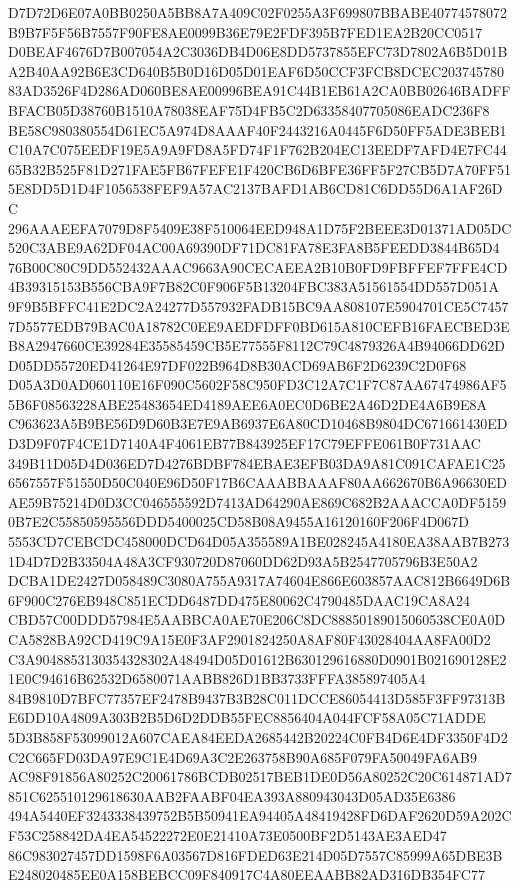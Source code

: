 \documentclass[UTF8,fontset=fandol,zihao=-4,a4paper]{ctexart}
\begin{document}
{{D7D72D6E07A0BB0250A5BB8A7A409C02F0255A3F699807BBABE40774578072B9B7F5F56B7557F90FE8AE0099B36E79E2FDF395B7FED1EA2B20CC0517
D0BEAF4676D7B007054A2C3036DB4D06E8DD5737855EFC73D7802A6B5D01BA2B40AA92B6E3CD640B5B0D16D05D01EAF6D50CCF3FCB8DCEC203745780
83AD3526F4D286AD060BE8AE00996BEA91C44B1EB61A2CA0BB02646BADFFBFACB05D38760B1510A78038EAF75D4FB5C2D63358407705086EADC236F8
BE58C980380554D61EC5A974D8AAAF40F2443216A0445F6D50FF5ADE3BEB1C10A7C075EEDF19E5A9A9FD8A5FD74F1F762B204EC13EEDF7AFD4E7FC44
65B32B525F81D271FAE5FB67FEFE1F420CB6D6BFE36FF5F27CB5D7A70FF515E8DD5D1D4F1056538FEF9A57AC2137BAFD1AB6CD81C6DD55D6A1AF26DC
296AAAEEFA7079D8F5409E38F510064EED948A1D75F2BEEE3D01371AD05DC520C3ABE9A62DF04AC00A69390DF71DC81FA78E3FA8B5FEEDD3844B65D4
76B00C80C9DD552432AAAC9663A90CECAEEA2B10B0FD9FBFFEF7FFE4CD4B39315153B556CBA9F7B82C0F906F5B13204FBC383A51561554DD557D051A
9F9B5BFFC41E2DC2A24277D557932FADB15BC9AA808107E5904701CE5C74577D5577EDB79BAC0A18782C0EE9AEDFDFF0BD615A810CEFB16FAECBED3E
B8A2947660CE39284E35585459CB5E77555F8112C79C4879326A4B94066DD62DD05DD55720ED41264E97DF022B964D8B30ACD69AB6F2D6239C2D0F68
D05A3D0AD060110E16F090C5602F58C950FD3C12A7C1F7C87AA67474986AF55B6F08563228ABE25483654ED4189AEE6A0EC0D6BE2A46D2DE4A6B9E8A
C963623A5B9BE56D9D60B3E7E9AB6937E6A80CD10468B9804DC671661430EDD3D9F07F4CE1D7140A4F4061EB77B843925EF17C79EFFE061B0F731AAC
349B11D05D4D036ED7D4276BDBF784EBAE3EFB03DA9A81C091CAFAE1C256567557F51550D50C040E96D50F17B6CAAABBAAAF80AA662670B6A96630ED
AE59B75214D0D3CC046555592D7413AD64290AE869C682B2AAACCA0DF51590B7E2C55850595556DDD5400025CD58B08A9455A16120160F206F4D067D
5553CD7CEBCDC458000DCD64D05A355589A1BE028245A4180EA38AAB7B2731D4D7D2B33504A48A3CF930720D87060DD62D93A5B2547705796B3E50A2
DCBA1DE2427D058489C3080A755A9317A74604E866E603857AAC812B6649D6B6F900C276EB948C851ECDD6487DD475E80062C4790485DAAC19CA8A24
CBD57C00DDD57984E5AABBCA0AE70E206C8DC88850189015060538CE0A0DCA5828BA92CD419C9A15E0F3AF2901824250A8AF80F43028404AA8FA00D2
C3A9048853130354328302A48494D05D01612B630129616880D0901B021690128E21E0C94616B62532D6580071AABB826D1BB3733FFFA385897405A4
84B9810D7BFC77357EF2478B9437B3B28C011DCCE86054413D585F3FF97313BE6DD10A4809A303B2B5D6D2DDB55FEC8856404A044FCF58A05C71ADDE
5D3B858F53099012A607CAEA84EEDA2685442B20224C0FB4D6E4DF3350F4D2C2C665FD03DA97E9C1E4D69A3C2E263758B90A685F079FA50049FA6AB9
AC98F91856A80252C20061786BCDB02517BEB1DE0D56A80252C20C614871AD7851C625510129618630AAB2FAABF04EA393A880943043D05AD35E6386
494A5440EF3243338439752B5B50941EA94405A48419428FD6DAF2620D59A202CF53C258842DA4EA54522272E0E21410A73E0500BF2D5143AE3AED47
86C983027457DD1598F6A03567D816FDED63E214D05D7557C85999A65DBE3BE248020485EE0A158BEBCC09F840917C4A80EEAABB82AD316DB354FC77
}}
\end{document}
